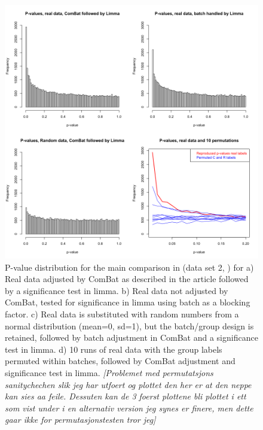 \documentclass{bio}
\newcommand\NB[1]{\textcolor{NBcol}{\textit{#1}}} %
\newcommand\NOTE[1]{\NB{[#1]}} %
\begin{document}
\begin{figure}[!p]
\centering\includegraphics[width=13cm]{Fig/pvaluesjohnson.png}
\caption{
P-value distribution for the main comparison in (data set 2, \citealp{Johnson2007}) for  
a) Real data adjusted by ComBat as described in the article followed by a significance test in limma. 
b) Real data not adjusted by ComBat, tested for significance in limma using batch as a blocking factor. 
c) Real data is substituted with random numbers from a normal distribution (mean=0, sd=1), but the batch/group design is retained, followed by batch adjustment in ComBat and a significance test in limma.
d) 10 runs of real data with the group labels permuted within batches, followed by ComBat adjustment and significance test in limma.   
\NOTE{Problemet med permutatsjons sanitychechen slik jeg har utfoert og plottet den her er at den neppe kan sies aa feile. Dessuten kan de 3 foerst plottene bli plottet i ett som vist under i en alternativ version jeg synes er finere, men dette gaar ikke for permutasjonstesten tror jeg}
}
\label{fig:p-johnson}
\end{figure}
\end{document}
